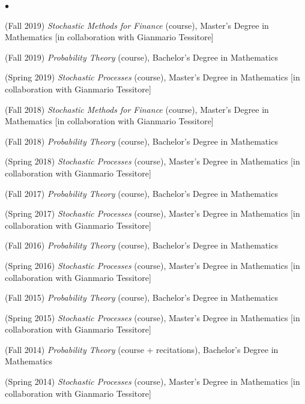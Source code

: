\documentclass[a4paper,11pt,oneside]{amsart}
\newenvironment{myitemize}{%
\begin{list}{$\bullet$}%
 	{%
	\setlength{\itemsep}{0.3em}%
	\setlength{\topsep}{0.3em}%
	\setlength{\partopsep}{0em}%
	\setlength{\parsep}{0em}%
	\setlength{\parskip}{0em}%
	\setlength\leftmargin{1.5em}%
	\setlength\labelwidth{1.1em}%
	\setlength{\labelsep}{0.4em}%
	}%
	}%
{\end{list}}
\renewenvironment{itemize}{
\begin{myitemize}}%
{\end{myitemize}}
\begin{document}
\begin{itemize}
\item (Fall 2019)
\textit{Stochastic Methods for Finance} (course),
Master's Degree in Mathematics
[in collaboration with Gianmario Tessitore]

\item (Fall 2019)
\textit{Probability Theory} (course),
Bachelor's Degree in Mathematics

\item (Spring 2019)
\textit{Stochastic Processes} (course),
Master's Degree in Mathematics
[in collaboration with Gianmario Tessitore]

\item (Fall 2018)
\textit{Stochastic Methods for Finance} (course),
Master's Degree in Mathematics
[in collaboration with Gianmario Tessitore]

\item (Fall 2018)
\textit{Probability Theory} (course),
Bachelor's Degree in Mathematics

\item (Spring 2018)
\textit{Stochastic Processes} (course),
Master's Degree in Mathematics
[in collaboration with Gianmario Tessitore]

\item (Fall 2017)
\textit{Probability Theory} (course),
Bachelor's Degree in Mathematics

\item (Spring 2017)
\textit{Stochastic Processes} (course),
Master's Degree in Mathematics
[in collaboration with Gianmario Tessitore]

\item (Fall 2016)
\textit{Probability Theory} (course),
Bachelor's Degree in Mathematics

\item (Spring 2016)
\textit{Stochastic Processes} (course),
Master's Degree in Mathematics
[in collaboration with Gianmario Tessitore]

\item (Fall 2015)
\textit{Probability Theory} (course),
Bachelor's Degree in Mathematics

\item (Spring 2015)
\textit{Stochastic Processes} (course),
Master's Degree in Mathematics
[in collaboration with Gianmario Tessitore]

\item (Fall 2014)
\textit{Probability Theory} (course + recitations),
Bachelor's Degree in Mathematics

\item (Spring 2014)
\textit{Stochastic Processes} (course),
Master's Degree in Mathematics
[in collaboration with Gianmario Tessitore]


\end{itemize}
\end{document}
